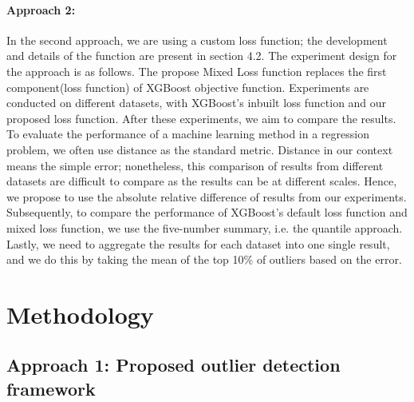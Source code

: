 \documentclass[runningheads]{llncs}
\begin{document}
\paragraph*{Approach 2:} In the second approach, we are using a custom loss function; the development and details of the function are present in section 4.2.  The experiment design for the approach is as follows. The propose Mixed Loss function replaces the first component(loss function) of XGBoost objective function. Experiments are conducted on different datasets, with XGBoost's inbuilt loss function and our proposed loss function. After these experiments, we aim to compare the results. To evaluate the performance of a machine learning method in a regression problem, we often use distance as the standard metric. Distance in our context means the simple error; nonetheless, this comparison of results from different datasets are difficult to compare as the results can be at different scales. Hence, we propose to use the absolute relative difference of results from our experiments. Subsequently, to compare the performance of XGBoost's default loss function and mixed loss function, we use the five-number summary, i.e. the quantile approach. Lastly, we need to aggregate the results for each dataset into one single result, and we do this by taking the mean of the top 10\% of outliers based on the error.



\section{Methodology}
\subsection{Approach 1: Proposed outlier detection framework}
\end{document}
